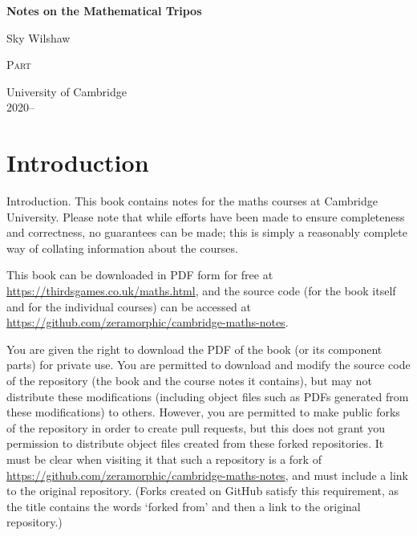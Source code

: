 \documentclass[headings=optiontotoc]{scrbook}
\begin{document}
\begin{titlepage}
	\begin{center}
		\vspace*{1cm}

		\Huge
		\textbf{Notes on the Mathematical Tripos}

		\vspace{0.5cm}
		\LARGE
		Sky Wilshaw

		\vfill

		\Huge
		\textsc{Part \yearnumber}

		\vfill

		\Large
		University of Cambridge\\
		2020--\the\year{}

	\end{center}
\end{titlepage}

\dominitoc{}

\setcounter{tocdepth}{0}
\cleardoubleoddpage
\tableofcontents
\newpage
\setcounter{tocdepth}{3}

\chapter*{Introduction}
Introduction.
\iffalse
This book contains notes for the maths courses at Cambridge University.
Please note that while efforts have been made to ensure completeness and correctness, no guarantees can be made; this is simply a reasonably complete way of collating information about the courses.

This book can be downloaded in PDF form for free at \url{https://thirdsgames.co.uk/maths.html}, and the source code (for the book itself and for the individual courses) can be accessed at \url{https://github.com/zeramorphic/cambridge-maths-notes}.

You are given the right to download the PDF of the book (or its component parts) for private use.
You are permitted to download and modify the source code of the repository (the book and the course notes it contains), but may not distribute these modifications (including object files such as PDFs generated from these modifications) to others.
However, you are permitted to make public forks of the repository in order to create pull requests, but this does not grant you permission to distribute object files created from these forked repositories.
It must be clear when visiting it that such a repository is a fork of \url{https://github.com/zeramorphic/cambridge-maths-notes}, and must include a link to the original repository.
(Forks created on GitHub satisfy this requirement, as the title contains the words `forked from' and then a link to the original repository.)
\end{document}
